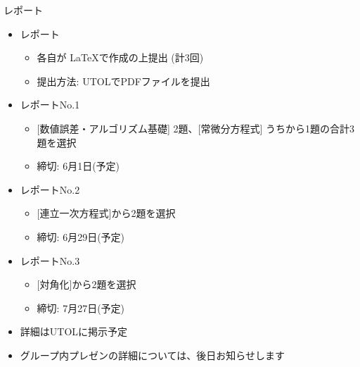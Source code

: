 \begin{frame}[t,fragile]{レポート}
  \begin{itemize}
  \item レポート
    \begin{itemize}
    \item 各自が \LaTeX で作成の上提出 (計3回)
    \item 提出方法: UTOLでPDFファイルを提出
    \end{itemize}
  \item レポートNo.1
    \begin{itemize}
    \item \mbox{} [数値誤差・アルゴリズム基礎] 2題、[常微分方程式] うちから1題の合計3題を選択
    \item 締切: 6月1日(予定)
    \end{itemize}
  \item レポートNo.2
    \begin{itemize}
    \item \mbox{} [連立一次方程式]から2題を選択
    \item 締切: 6月29日(予定)
    \end{itemize}
  \item レポートNo.3
    \begin{itemize}
    \item \mbox{} [対角化]から2題を選択
    \item 締切: 7月27日(予定)
    \end{itemize}
  \item 詳細はUTOLに掲示予定
  \item グループ内プレゼンの詳細については、後日お知らせします
  \end{itemize}    
\end{frame}

